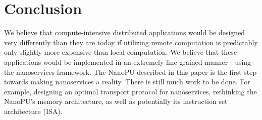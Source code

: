 \section{Conclusion}
We believe that compute-intensive distributed applications would be designed very differently than they are today if utilizing remote computation is predictably only slightly more expensive than local computation.
We believe that these applications would be implemented in an extremely fine grained manner - using the nanoservices framework.
The NanoPU described in this paper is the first step towards making nanoservices a reality.
There is still much work to be done.
For example, designing an optimal transport protocol for nanoservices, rethinking the NanoPU's memory architecture, as well as potentially its instruction set architecture (ISA).
